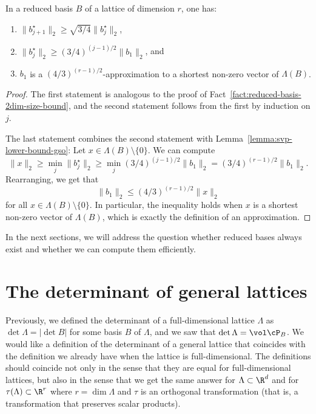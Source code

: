 \begin{lemma}
  \label{lemma:size-bounds-reduced-basis}
  In a reduced basis $B$ of a lattice of dimension $r$, one has:
  \begin{enumerate}
    \item $\|b_{j+1}^\star\|_2 \geq \sqrt{3/4} \|b_j^\star\|_2$,
    \item $\|b_j^\star\|_2 \geq (3/4)^{(j-1)/2} \|b_1\|_2$, and
    \item $b_1$ is a $(4/3)^{(r-1)/2}$-approximation to a shortest non-zero vector of $\Lambda(B)$.
  \end{enumerate}
\end{lemma}
\begin{proof}
  The first statement is analogous to the proof of Fact~\ref{fact:reduced-basis-2dim-size-bound},
  and the second statement follows from the first by induction on $j$.

  The last statement combines the second statement with Lemma~\ref{lemma:svp-lower-bound-gso}:
  Let $x \in \Lambda(B) \setminus \{ 0 \}$.
  We can compute
  \[
    \|x\|_2 \geq \min_j \|b_j^\star\|_2 \geq \min_j (3/4)^{(j-1)/2} \|b_1\|_2 = (3/4)^{(r-1)/2} \|b_1\|_2.
  \]
  Rearranging, we get that
  \[
    \|b_1\|_2 \leq (4/3)^{(r-1)/2} \|x\|_2
  \]
  for all $x \in \Lambda(B) \setminus \{ 0 \}$.
  In particular, the inequality holds when $x$ is a shortest non-zero vector of $\Lambda(B)$,
  which is exactly the definition of an approximation.
\end{proof}

In the next sections, we will address the question
whether reduced bases always exist and whether we can compute them efficiently.



\section{The determinant of general lattices}
\label{sec:determinant-general-lattices}

Previously, we defined the determinant of a full-dimensional lattice $\Lambda$
as $\det \Lambda = |\det B|$ for some basis $B$ of $\Lambda$,
and we saw that $\det \Lambda = \vol \cP_B$.
We would like a definition of the determinant of a general lattice
that coincides with the definition we already have when the lattice is full-dimensional.
The definitions should coincide not only in the sense that they are equal for full-dimensional lattices,
but also in the sense that we get the same answer for $\Lambda \subset \R^d$
and for $\tau(\Lambda) \subset \R^r$ where $r = \dim\Lambda$ and $\tau$ is an orthogonal transformation
(that is, a transformation that preserves scalar products).

